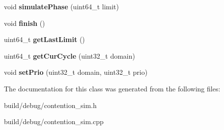 \begin{DoxyCompactItemize}
\item 
\hypertarget{classContentionSim_a961f4d3a18597d2413188a67cb800ee5}{void {\bfseries simulate\-Phase} (uint64\-\_\-t limit)}\label{classContentionSim_a961f4d3a18597d2413188a67cb800ee5}

\item 
\hypertarget{classContentionSim_a0d5aeadd8d3270a37ef7dcf79488621d}{void {\bfseries finish} ()}\label{classContentionSim_a0d5aeadd8d3270a37ef7dcf79488621d}

\item 
\hypertarget{classContentionSim_ae9982a572df654edb1bf6a7f5f0d2197}{uint64\-\_\-t {\bfseries get\-Last\-Limit} ()}\label{classContentionSim_ae9982a572df654edb1bf6a7f5f0d2197}

\item 
\hypertarget{classContentionSim_a782a5b4f4f1d980cd781ef9b87c2c7c3}{uint64\-\_\-t {\bfseries get\-Cur\-Cycle} (uint32\-\_\-t domain)}\label{classContentionSim_a782a5b4f4f1d980cd781ef9b87c2c7c3}

\item 
\hypertarget{classContentionSim_aff58f59d88d745695f24441f08fc0eb8}{void {\bfseries set\-Prio} (uint32\-\_\-t domain, uint32\-\_\-t prio)}\label{classContentionSim_aff58f59d88d745695f24441f08fc0eb8}

\end{DoxyCompactItemize}


The documentation for this class was generated from the following files\-:\begin{DoxyCompactItemize}
\item 
build/debug/contention\-\_\-sim.\-h\item 
build/debug/contention\-\_\-sim.\-cpp\end{DoxyCompactItemize}
